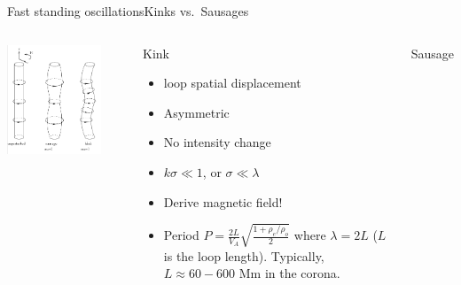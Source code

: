 \documentclass[table]{beamer}
\begin{document}
\begin{frame}[c]{Fast standing oscillations}{Kinks vs.\ Sausages}
    \begin{columns}
        \column{0.5\paperwidth}
        \begin{center}
            \includegraphics[width=0.8\textwidth]{kink_saus.png}
        \end{center}
        \column{0.5\paperwidth}
        \vspace{-0.5in}
        \begin{block}{Kink}
            \begin{itemize}
                \item loop spatial displacement
                \item Asymmetric
                \item No intensity change
                \item $k\sigma \ll 1$, or $\sigma\ll\lambda$
                \item Derive magnetic field!
        \item Period $P=\frac{2L}{V_A}\sqrt{\frac{1+\rho_e/\rho_o}{2}}$
            where $\lambda=2L$ ($L$ is the loop length).
            Typically, $L \approx 60-600$ Mm in the corona.
            \end{itemize}
        \end{block}
        \begin{block}{Sausage}

\end{block}
\end{columns}
\end{frame}
\end{document}
